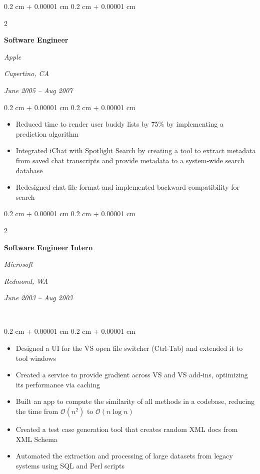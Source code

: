 \documentclass[10pt, letterpaper]{article}
\newenvironment{highlights}{
  \begin{itemize}[
        topsep=0.10 cm,
        parsep=0.10 cm,
        partopsep=0pt,
        itemsep=0pt,
        leftmargin=0.4 cm + 10pt
      ]
    }{
  \end{itemize}
} %
\newenvironment{onecolentry}{
  \begin{adjustwidth}{
      0.2 cm + 0.00001 cm
    }{
      0.2 cm + 0.00001 cm
    }
  }{
  \end{adjustwidth}
} %
\newenvironment{twocolentry}[2][]{
  \onecolentry
  \def\secondColumn{#2}
  \setcolumnwidth{\fill, 4.5 cm}
  \begin{paracol}{2}
  }{
    \switchcolumn \raggedleft \secondColumn
  \end{paracol}
  \endonecolentry
} %
\begin{document}
\begin{twocolentry}{
		\textit{Cupertino, CA}

		\textit{June 2005 – Aug 2007}}
	\textbf{Software Engineer}

	\textit{Apple}
\end{twocolentry}

\vspace{0.10 cm}
\begin{onecolentry}
	\begin{highlights}
		\item Reduced time to render user buddy lists by 75\% by implementing a prediction algorithm
		\item Integrated iChat with Spotlight Search by creating a tool to extract metadata from saved chat
		transcripts and provide metadata to a system-wide search database
		\item Redesigned chat file format and implemented backward compatibility for search
	\end{highlights}
\end{onecolentry}

\vspace{0.2 cm}

\begin{twocolentry}{
		\textit{Redmond, WA}

		\textit{June 2003 – Aug 2003}}
	\textbf{Software Engineer Intern}

	\textit{Microsoft}
\end{twocolentry}

\
\begin{onecolentry}
	\begin{highlights}
		\item Designed a UI for the VS open file switcher (Ctrl-Tab) and extended it to tool windows
		\item Created a service to provide gradient across VS and VS add-ins, optimizing its performance via caching
		\item Built an app to compute the similarity of all methods in a codebase, reducing the time from
		$\mathcal{O}(n^2)$ to $\mathcal{O}(n \log n)$
		\item Created a test case generation tool that creates random XML docs from XML Schema
		\item Automated the extraction and processing of large datasets from legacy systems using SQL and Perl scripts
	\end{highlights}
\end{onecolentry}
\end{document}
